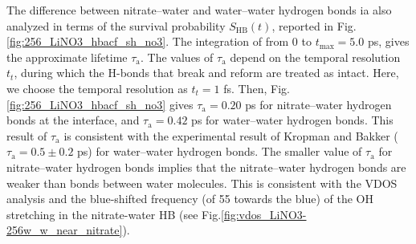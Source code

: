 %
The difference between nitrate--water and water--water hydrogen bonds 
ia also analyzed in terms of the survival probability $S_{\text{HB}}(t)$, \cite{AKS86,JT90,AL96} 
reported in Fig.\thinspace\ref {fig:256_LiNO3_hbacf_sh_no3}.
The integration of \SHB from 0 to $t_{\max}=5.0$ ps, \cite{Steinel2004} gives the approximate lifetime $\tau_\text{a}$. \cite{SC02} 
The values of $\tau_{\text{a}}$ depend on the temporal resolution $t_t$, during which the H-bonds that break and reform are treated as intact. \cite{AL00} 
%
Here, we choose the temporal resolution as $t_t=1$ fs. 
Then, Fig.\thinspace\ref {fig:256_LiNO3_hbacf_sh_no3} gives $\tau_\text{a}=0.20$ ps for nitrate--water hydrogen bonds at the interface, 
and $\tau_\text{a}=0.42$ ps for water--water hydrogen bonds.
This result of $\tau_\text{a}$ is consistent with the experimental result of Kropman and Bakker ($\tau_\text{a}=0.5\pm0.2$ ps) for water--water hydrogen bonds. 
\cite{MFK01} %
The smaller value of $\tau_\text{a}$ for nitrate--water hydrogen bonds implies that the nitrate--water hydrogen bonds are weaker than bonds between water molecules. 
This is consistent with the VDOS analysis and the blue-shifted frequency (of 55 \cm towards the blue) of the OH stretching in the nitrate-water HB 
(see Fig.\thinspace\ref{fig:vdos_LiNO3-256w_w_near_nitrate}). 


